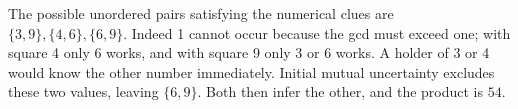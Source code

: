 The possible unordered pairs satisfying the numerical clues are $\{3,9\},\{4,6\},\{6,9\}$. Indeed 1 cannot occur because the gcd must exceed one; with square 4 only 6 works, and with square 9 only 3 or 6 works. A holder of 3 or 4 would know the other number immediately. Initial mutual uncertainty excludes these two values, leaving $\{6,9\}$. Both then infer the other, and the product is $\boxed{54}$.
